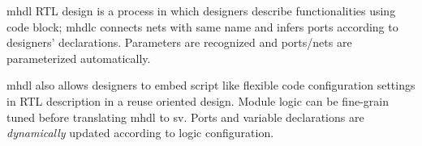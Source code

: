 \gls{mhdl} RTL design is a process in which designers describe functionalities 
using \gls{code block}; \gls{mhdlc} connects nets with same name and infers
ports according to designers' declarations. Parameters are recognized
and ports/nets are parameterized automatically.

\gls{mhdl} also allows designers to embed script like flexible code configuration
settings in RTL description in a reuse oriented design. Module logic
can be fine-grain tuned before translating \gls{mhdl} to \gls{sv}. Ports
and variable declarations are \emph{dynamically} updated according to
logic configuration.

